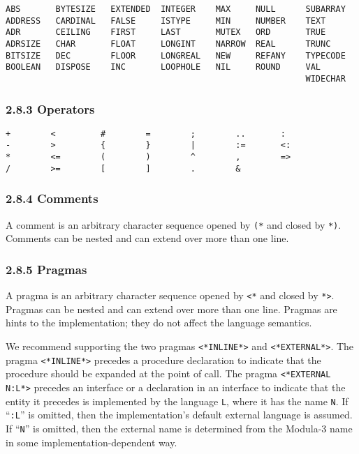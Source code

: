 \documentclass[10pt]{article}
\begin{document}
\begin{verbatim}
ABS       BYTESIZE   EXTENDED  INTEGER    MAX     NULL      SUBARRAY
ADDRESS   CARDINAL   FALSE     ISTYPE     MIN     NUMBER    TEXT
ADR       CEILING    FIRST     LAST       MUTEX   ORD       TRUE
ADRSIZE   CHAR       FLOAT     LONGINT    NARROW  REAL      TRUNC
BITSIZE   DEC        FLOOR     LONGREAL   NEW     REFANY    TYPECODE
BOOLEAN   DISPOSE    INC       LOOPHOLE   NIL     ROUND     VAL
                                                            WIDECHAR
\end{verbatim}

\subsubsection*{2.8.3 Operators}

\begin{verbatim}
+        <         #        =        ;        ..       :
-        >         {        }        |        :=       <:
*        <=        (        )        ^        ,        =>
/        >=        [        ]        .        &
\end{verbatim}

\subsubsection*{2.8.4 Comments}

A comment is an arbitrary character sequence opened by \verb|(*| and closed by
\verb|*)|.  Comments can be nested and can extend over more than one line.

\subsubsection*{2.8.5 Pragmas}

A pragma is an arbitrary character sequence opened by \verb|<*| and closed by
\verb|*>|.  Pragmas can be nested and can extend over more than one line.
Pragmas are hints to the implementation; they do not affect the language
semantics.

We recommend supporting the two pragmas \verb|<*INLINE*>| and
\verb|<*EXTERNAL*>|.  The pragma \verb|<*INLINE*>| precedes a procedure
declaration to indicate that the procedure should be expanded at the point of
call.  The pragma \verb|<*EXTERNAL| \verb|N:L*>| precedes an interface or a
declaration in an interface to indicate that the entity it precedes is
implemented by the language \verb|L|, where it has the name \verb|N|.  If
``\verb|:L|'' is omitted, then the implementation's default external language
is assumed.  If ``\verb|N|'' is omitted, then the external name is determined
from the Modula-3 name in some implementation-dependent way.
\end{document}

